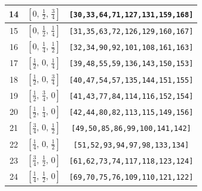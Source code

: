 \documentclass[fleqn,8pt]{jsarticle}
\begin{document}
\begin{longtable}{ccc}
14 & $\left[ 0,\, \frac{1}{2},\, \frac{3}{4} \right]$ & {\tt [30,33,64,71,127,131,159,168]} \\ \hline
15 & $\left[ 0,\, \frac{1}{2},\, \frac{1}{4} \right]$ & {\tt [31,35,63,72,126,129,160,167]} \\ \hline
16 & $\left[ 0,\, \frac{1}{4},\, \frac{1}{2} \right]$ & {\tt [32,34,90,92,101,108,161,163]} \\ \hline
17 & $\left[ \frac{1}{2},\, 0,\, \frac{1}{4} \right]$ & {\tt [39,48,55,59,136,143,150,153]} \\ \hline
18 & $\left[ \frac{1}{2},\, 0,\, \frac{3}{4} \right]$ & {\tt [40,47,54,57,135,144,151,155]} \\ \hline
19 & $\left[ \frac{1}{2},\, \frac{3}{4},\, 0 \right]$ & {\tt [41,43,77,84,114,116,152,154]} \\ \hline
20 & $\left[ \frac{1}{2},\, \frac{1}{4},\, 0 \right]$ & {\tt [42,44,80,82,113,115,149,156]} \\ \hline
21 & $\left[ \frac{3}{4},\, 0,\, \frac{1}{2} \right]$ & {\tt [49,50,85,86,99,100,141,142]} \\ \hline
22 & $\left[ \frac{1}{4},\, 0,\, \frac{1}{2} \right]$ & {\tt [51,52,93,94,97,98,133,134]} \\ \hline
23 & $\left[ \frac{3}{4},\, \frac{1}{2},\, 0 \right]$ & {\tt [61,62,73,74,117,118,123,124]} \\ \hline
24 & $\left[ \frac{1}{4},\, \frac{1}{2},\, 0 \right]$ & {\tt [69,70,75,76,109,110,121,122]} \\
\end{longtable}
\renewcommand{\arraystretch}{1.2}
\end{document}
